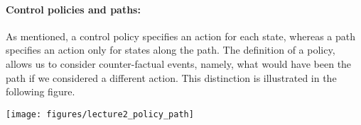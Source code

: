 %

\paragraph{Control policies and paths:}
As mentioned, a control policy specifies an action for each state,
whereas a path specifies an action only for states along the path.
The definition of a policy, allows us to consider counter-factual
events, namely, what would have been the path if we considered a
different action. This distinction is illustrated in the following
figure.

\begin{centering}
\texttt{[image: figures/lecture2\_policy\_path]}\\
\end{centering}

